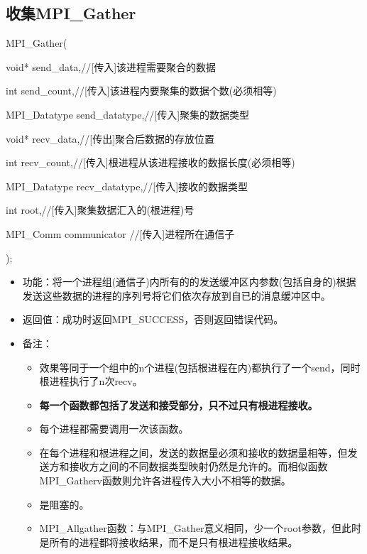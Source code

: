 \documentclass[UTF8]{article}%
\begin{document}
\subsection{收集MPI\_Gather}

MPI\_Gather(

    \qquad void* send\_data,//[传入]该进程需要聚合的数据

    \qquad int send\_count,//[传入]该进程内要聚集的数据个数(必须相等)

    \qquad MPI\_Datatype send\_datatype,//[传入]聚集的数据类型

    \qquad void* recv\_data,//[传出]聚合后数据的存放位置

    \qquad int recv\_count,//[传入]根进程从该进程接收的数据长度(必须相等)

    \qquad MPI\_Datatype recv\_datatype,//[传入]接收的数据类型

    \qquad int root,//[传入]聚集数据汇入的(根进程)号

    \qquad MPI\_Comm communicator //[传入]进程所在通信子
    
);

\begin{itemize}
    \item 功能：将一个进程组(通信子)内所有的的发送缓冲区内参数(包括自身的)根据发送这些数据的进程的序列号将它们依次存放到自已的消息缓冲区中。
    \item 返回值：成功时返回MPI\_SUCCESS，否则返回错误代码。
    \item 备注：
    
    {
        \begin{itemize}
            \item 效果等同于一个组中的n个进程(包括根进程在内)都执行了一个send，同时根进程执行了n次recv。
            \item \textbf{每一个函数都包括了发送和接受部分，只不过只有根进程接收。}
            \item 每个进程都需要调用一次该函数。
            \item 在每个进程和根进程之间，发送的数据量必须和接收的数据量相等，但发送方和接收方之间的不同数据类型映射仍然是允许的。而相似函数MPI\_Gatherv函数则允许各进程传入大小不相等的数据。
            \item 是阻塞的。
            \item MPI\_Allgather函数：与MPI\_Gather意义相同，少一个root参数，但此时是所有的进程都将接收结果，而不是只有根进程接收结果。
        \end{itemize}
    }
\end{itemize}
\end{document}
